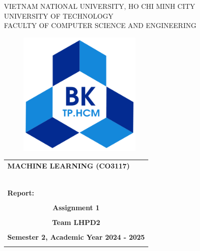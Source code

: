 \documentclass[openany]{mitthesis}
\theoremstyle{definition}
\begin{document}

\begin{titlepage}
\begin{center}
VIETNAM NATIONAL UNIVERSITY, HO CHI MINH CITY \\
UNIVERSITY OF TECHNOLOGY \\
FACULTY OF COMPUTER SCIENCE AND ENGINEERING
\end{center}

\begin{figure}[h!]
\begin{center}
\includegraphics[width=6cm]{hcmut.png}
\end{center}
\end{figure}

\begin{center}
\begin{tabular}{c}
\multicolumn{1}{l}{\textbf{{\Large MACHINE LEARNING (CO3117)}}}\\
~~\\
\hline
\\
\multicolumn{1}{l}{\textbf{{\Large Report:}}}\\
\\
\textbf{{\Huge Assignment 1}}\\
\\
\textbf{{Team LHPD2}}\\
\\
\textbf{Semester 2, Academic Year 2024 - 2025}\\
\\
\hline
\end{tabular}
\end{center}

\vspace{1cm}


\end{titlepage}
\end{document}
